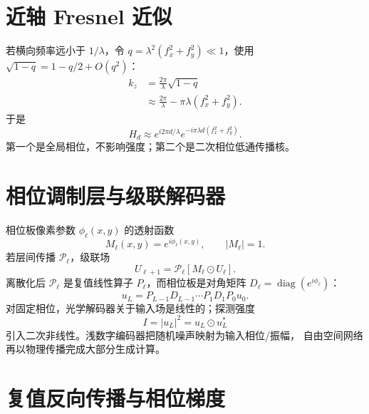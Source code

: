 \documentclass[11pt]{article}
\numberwithin{equation}{section}
\newcommand{\1}{\mathbf{1}}
\newcommand{\diag}{\operatorname{diag}}
\begin{document}
\section{近轴 Fresnel 近似}

若横向频率远小于 $1/\lambda$，令
$q=\lambda^2(f_x^2+f_y^2)\ll1$，使用
$\sqrt{1-q}=1-q/2+O(q^2)$：
\begin{align}
 k_z
 &=\frac{2\pi}{\lambda}\sqrt{1-q}\\
 &\approx\frac{2\pi}{\lambda}
 -\pi\lambda(f_x^2+f_y^2).
\end{align}
于是
\begin{equation}
 H_d\approx e^{i2\pi d/\lambda}
 e^{-i\pi\lambda d(f_x^2+f_y^2)}.
\end{equation}
第一个是全局相位，不影响强度；第二个是二次相位低通传播核。

\section{相位调制层与级联解码器}

相位板像素参数 $\phi_\ell(x,y)$ 的透射函数
\begin{equation}
 M_\ell(x,y)=e^{i\phi_\ell(x,y)},\qquad |M_\ell|=1.
\end{equation}
若层间传播 $\mathcal P_\ell$，级联场
\begin{equation}
 U_{\ell+1}=\mathcal P_\ell[M_\ell\odot U_\ell].
\end{equation}
离散化后 $\mathcal P_\ell$ 是复值线性算子 $P_\ell$，而相位板是对角矩阵
$D_\ell=\diag(e^{i\phi_\ell})$：
\begin{equation}
 u_L=P_{L-1}D_{L-1}\cdots P_1D_1P_0u_0.
\end{equation}
对固定相位，光学解码器关于输入场是线性的；探测强度
\begin{equation}
 I=|u_L|^2=u_L\odot u_L^*
\end{equation}
引入二次非线性。浅数字编码器把随机噪声映射为输入相位/振幅，
自由空间网络再以物理传播完成大部分生成计算。

\section{复值反向传播与相位梯度}
\end{document}
